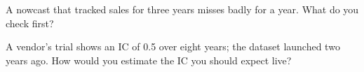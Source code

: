 \begin{interviewq}\label{iq:ml:alternative-data-pipelines:5}
A nowcast that tracked sales for three years misses badly for a year. What do you check first?
\end{interviewq}

\begin{interviewq}\label{iq:ml:alternative-data-pipelines:6}
A vendor's trial shows an IC of 0.5 over eight years; the dataset launched two years ago. How would you estimate the IC you
should expect live?
\end{interviewq}
